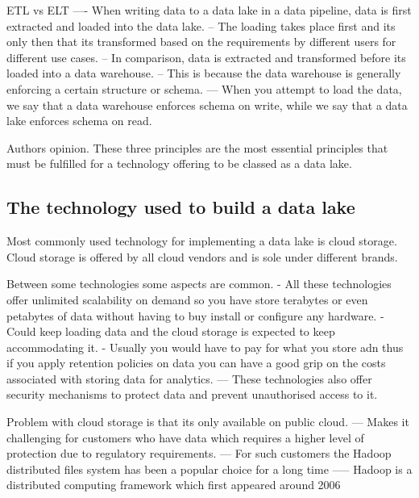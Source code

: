 \documentclass[a4paper, 11pt]{article}
\begin{document}
    ETL vs ELT
    ---- When writing data to a data lake in a data pipeline, data is first extracted and loaded into the data lake.
    -- The loading takes place first and its only then that its transformed based on the requirements by different users for different use cases.
    -- In comparison, data is extracted and transformed before its loaded into a data warehouse.
    -- This is because the data warehouse is generally enforcing a certain structure or schema.
    --- When you attempt to load the data, we say that a data warehouse enforces schema on write, while we say that a data lake enforces schema on read.

    Authors opinion.
    These three principles are the most essential principles that must be fulfilled for a technology offering to be classed as a data lake.

    \subsection{The technology used to build a data lake}
    Most commonly used technology for implementing a data lake is cloud storage.
    Cloud storage is offered by all cloud vendors and is sole under different brands.

    Between some technologies some aspects are common.
    - All these technologies offer unlimited scalability on demand so you have store terabytes or even petabytes of data without having to buy install or configure any hardware.
    - Could keep loading data and the cloud storage is expected to keep accommodating it.
    - Usually you would have to pay for what you store adn thus if you apply retention policies on data you can have a good grip on the costs associated with storing data for analytics.
    --- These technologies also offer security mechanisms to protect data and prevent unauthorised access to it.

    Problem with cloud storage is that its only available on public cloud.
    --- Makes it challenging for customers who have data which requires a higher level of protection due to regulatory requirements.
    --- For such customers the Hadoop distributed files system has been a popular choice for a long time
    ----- Hadoop is a distributed computing framework which first appeared around 2006
\end{document}
